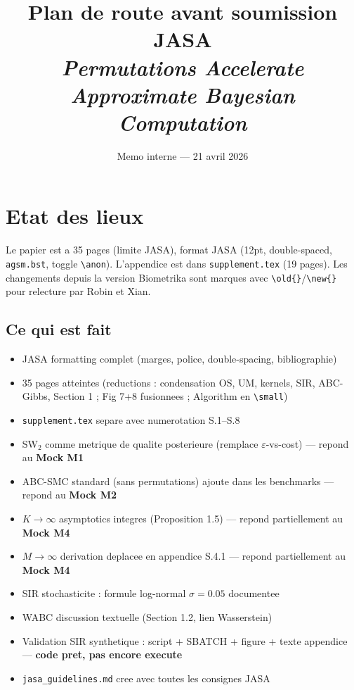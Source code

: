 \documentclass[11pt]{article}
\title{Plan de route avant soumission JASA\\[6pt]
\large\textit{Permutations Accelerate Approximate Bayesian Computation}}
\author{Memo interne --- 21 avril 2026}
\date{}
\begin{document}
\maketitle

\tableofcontents
\newpage

\section{Etat des lieux}

Le papier est a 35 pages (limite JASA), format JASA (12pt, double-spaced, \texttt{agsm.bst}, toggle \verb|\anon|). L'appendice est dans \texttt{supplement.tex} (19 pages). Les changements depuis la version Biometrika sont marques avec \verb|\old{}|/\verb|\new{}| pour relecture par Robin et Xian.

\subsection{Ce qui est fait}

\begin{itemize}[nosep]
    \item JASA formatting complet (marges, police, double-spacing, bibliographie)
    \item 35 pages atteintes (reductions : condensation OS, UM, kernels, SIR, ABC-Gibbs, Section 1 ; Fig 7+8 fusionnees ; Algorithm en \verb|\small|)
    \item \texttt{supplement.tex} separe avec numerotation S.1--S.8
    \item SW$_2$ comme metrique de qualite posterieure (remplace $\varepsilon$-vs-cost) --- repond au \textbf{Mock M1}
    \item ABC-SMC standard (sans permutations) ajoute dans les benchmarks --- repond au \textbf{Mock M2}
    \item $K\to\infty$ asymptotics integres (Proposition 1.5) --- repond partiellement au \textbf{Mock M4}
    \item $M\to\infty$ derivation deplacee en appendice S.4.1 --- repond partiellement au \textbf{Mock M4}
    \item SIR stochasticite : formule log-normal $\sigma=0.05$ documentee
    \item WABC discussion textuelle (Section 1.2, lien Wasserstein)
    \item Validation SIR synthetique : script + SBATCH + figure + texte appendice --- \textbf{code pret, pas encore execute}
    \item \texttt{jasa\_guidelines.md} cree avec toutes les consignes JASA
\end{itemize}
\end{document}
